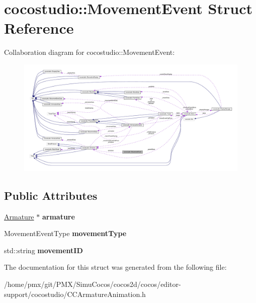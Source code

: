 \hypertarget{structcocostudio_1_1MovementEvent}{}\section{cocostudio\+:\+:Movement\+Event Struct Reference}
\label{structcocostudio_1_1MovementEvent}


Collaboration diagram for cocostudio\+:\+:Movement\+Event\+:
\nopagebreak
\begin{figure}[H]
\begin{center}
\leavevmode
\includegraphics[width=350pt]{structcocostudio_1_1MovementEvent__coll__graph}
\end{center}
\end{figure}
\subsection*{Public Attributes}
\begin{DoxyCompactItemize}
\item 
\mbox{\label{structcocostudio_1_1MovementEvent_ae9a7e8defc80f99cbc9a1f040c8aece4}} 
\hyperlink{classcocostudio_1_1Armature}{Armature} $\ast$ {\bfseries armature}
\item 
\mbox{\label{structcocostudio_1_1MovementEvent_ac631b2e11a7812cf3f923b8cdd227d8d}} 
Movement\+Event\+Type {\bfseries movement\+Type}
\item 
\mbox{\label{structcocostudio_1_1MovementEvent_a4b89dddc7c3a0467676ee9a383ab29e7}} 
std\+::string {\bfseries movement\+ID}
\end{DoxyCompactItemize}


The documentation for this struct was generated from the following file\+:\begin{DoxyCompactItemize}
\item 
/home/pmx/git/\+P\+M\+X/\+Simu\+Cocos/cocos2d/cocos/editor-\/support/cocostudio/C\+C\+Armature\+Animation.\+h\end{DoxyCompactItemize}
